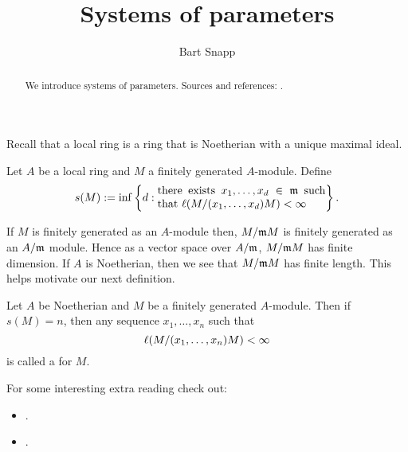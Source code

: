 \documentclass{ximera}
\author{Bart Snapp}
\title{Systems of parameters}
\begin{document}
\begin{abstract}
  We introduce systems of parameters. Sources and references:
  \cite{sD2008}.
\end{abstract}
\maketitle


Recall that a local ring is a ring that is Noetherian with a unique maximal ideal.

\begin{definition}
  Let $A$ be a local ring and $M$ a finitely generated $A$-module. Define
  \[
  s(M) := \inf\left\{d:
  \begin{minipage}{35ex}
    there exists $x_1,\dots, x_d\in \m$ such that $\l(M/(x_1,\dots,x_d)M)<\infty$
  \end{minipage} \right\}.
  \]
\end{definition}

If $M$ is finitely generated as an $A$-module then, $M/\mathfrak{m} M$ is
finitely generated as an $A/\mathfrak{m}$ module. Hence as a vector space over
$A/\mathfrak{m}$, $M/\mathfrak{m} M$ has finite dimension. If $A$ is Noetherian, then we
see that $M/\mathfrak{m} M$ has finite length. This helps motivate our next
definition.

\begin{definition}
  Let $A$ be Noetherian and $M$ be a finitely generated
  $A$-module. Then if $s(M) = n$, then any sequence $x_1,\dots, x_n$
  such that
  \[
  \l(M/(x_1,\dots,x_n)M)<\infty\index{finite length}
  \]
  is called a  for $M$. 
\end{definition}





For some interesting extra reading check out:
\begin{itemize}

\item {}.
\item {}.
\end{itemize}
\end{document}
